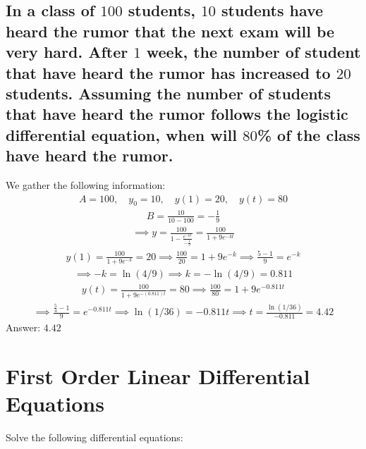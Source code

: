 \documentclass{article}
\begin{document}
\subsection{In a class of $100$ students, $10$ students have heard the rumor that the next exam will be very hard. After $1$ week, the number of student that have heard the rumor has increased to $20$ students. Assuming the number of students that have heard the rumor follows the logistic differential equation, when will $80$\% of the class have heard the rumor.}
We gather the following information:
\begin{align*}
	A = 100, \quad y_0 = 10, \quad y(1) = 20, \quad y(t) = 80
\end{align*}
\begin{align*}
	B = \frac{10}{10 - 100} = -\frac{1}{9}
\end{align*}
\begin{align*}
	\implies y = \frac{100}{1 - \frac{e^{-kt}}{-\frac{1}{9}}} = \frac{100}{1 + 9e^{-kt}}
\end{align*}
\begin{align*}
	y(1) = \frac{100}{1 + 9e^{-k}} = 20 \implies \frac{100}{20} = 1 + 9e^{-k} \implies \frac{5 - 1}{9} = e^{-k}
\end{align*}
\begin{align*}
	\implies -k = \ln{(4/9)} \implies k = -\ln{(4/9)} = 0.811
\end{align*}
\begin{align*}
	y(t) = \frac{100}{1 + 9e^{-(0.811)t}} = 80 \implies \frac{100}{80} = 1 + 9e^{-0.811t}
\end{align*}
\begin{align*}
	\implies \frac{\frac{5}{4} - 1}{9} = e^{-0.811t} \implies \ln{(1/36)} = -0.811t \implies t = \frac{\ln{(1/36)}}{-0.811} = 4.42
\end{align*}
Answer: $4.42$

\section{First Order Linear Differential Equations}
Solve the following differential equations:
\end{document}
